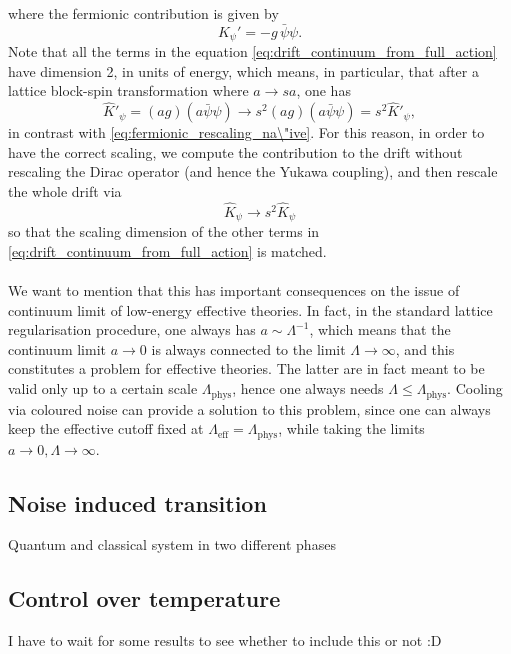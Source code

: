 where the fermionic contribution is given by
\begin{equation*}
    K_{\psi}' = - g \, \bar\psi\psi.
\end{equation*}
Note that all the terms in the equation \eqref{eq:drift_continuum_from_full_action} have dimension 2, in units of energy, which means, in particular, that after a lattice block-spin transformation where $a \to sa$, one has
\begin{equation}
    \widehat{K}'_\psi = (ag) (a\bar\psi \psi) \to s^2 (ag) (a\bar\psi \psi) = s^2 \widehat{K}'_\psi,
    \label{eq:rescaling_blinear}
\end{equation}
in contrast with \eqref{eq:fermionic_rescaling_na\"ive}. For this reason, in order to have the correct scaling, we compute the contribution to the drift without rescaling the Dirac operator (and hence the Yukawa coupling), and then rescale the whole drift via 
\begin{equation*}
    \widehat{K}_\psi \to s^2 \widehat{K}_\psi
\end{equation*}
so that the scaling dimension of the other terms in \eqref{eq:drift_continuum_from_full_action} is matched. \\~\\
We want to mention that this has important consequences on the issue of continuum limit of low-energy effective theories. In fact, in the standard lattice regularisation procedure, one always has $a \sim \Lambda^{-1}$, which means that the continuum limit $a \to 0$ is always connected to the limit $\Lambda \to \infty$, and this constitutes a problem for effective theories. The latter are in fact meant to be valid only up to a certain scale $\Lambda_\text{phys}$, hence one always needs $\Lambda \leq \Lambda_\text{phys}$. Cooling via coloured noise can provide a solution to this problem, since one can always keep the effective cutoff fixed at $\Lambda_\text{eff} = \Lambda_\text{phys}$, while taking the limits $a \to 0, \Lambda \to \infty$. 

\subsection{Noise induced transition}
Quantum and classical system in two different phases

\subsection{Control over temperature}
I have to wait for some results to see whether to include this or not :D

